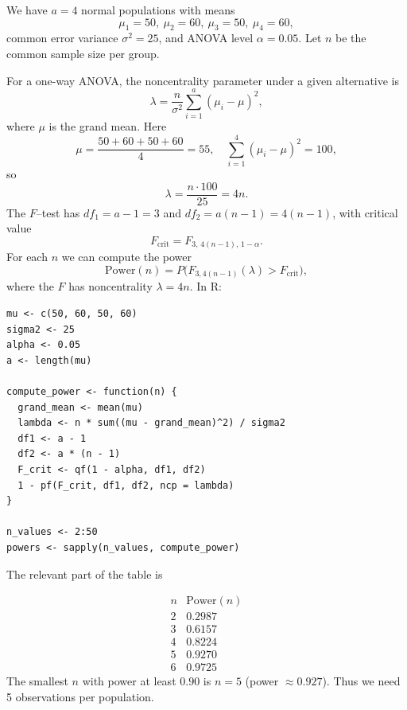 \documentclass[answers,12pt,addpoints]{exam}
\begin{document}
\begin{questions}
\begin{solution}
We have $a=4$ normal populations with means
\[
\mu_1=50,\ \mu_2=60,\ \mu_3=50,\ \mu_4=60,
\]
common error variance $\sigma^2=25$, and ANOVA level $\alpha=0.05$. Let $n$ be the common sample size per group.

For a one-way ANOVA, the noncentrality parameter under a given alternative is
\[
\lambda = \frac{n}{\sigma^2}\sum_{i=1}^a(\mu_i-\mu)^2,
\]
where $\mu$ is the grand mean. Here
\[
\mu = \frac{50+60+50+60}{4}=55,\quad
\sum_{i=1}^4(\mu_i-\mu)^2 = 100,
\]
so
\[
\lambda = \frac{n\cdot 100}{25} = 4n.
\]
The $F$–test has $df_1 = a-1 = 3$ and $df_2 = a(n-1) = 4(n-1)$, with critical value
\[
F_{\text{crit}} = F_{3,\,4(n-1),\,1-\alpha}.
\]
For each $n$ we can compute the power
\[
\text{Power}(n) = P\bigl(F_{3,4(n-1)}(\lambda) > F_{\text{crit}}\bigr),
\]
where the $F$ has noncentrality $\lambda=4n$. In R:

\begin{verbatim}
mu <- c(50, 60, 50, 60)
sigma2 <- 25
alpha <- 0.05
a <- length(mu)

compute_power <- function(n) {
  grand_mean <- mean(mu)
  lambda <- n * sum((mu - grand_mean)^2) / sigma2
  df1 <- a - 1
  df2 <- a * (n - 1)
  F_crit <- qf(1 - alpha, df1, df2)
  1 - pf(F_crit, df1, df2, ncp = lambda)
}

n_values <- 2:50
powers <- sapply(n_values, compute_power)
\end{verbatim}

The relevant part of the table is

\[
\begin{array}{c|c}
n & \text{Power}(n)\\
\hline
2 & 0.2987\\
3 & 0.6157\\
4 & 0.8224\\
5 & 0.9270\\
6 & 0.9725
\end{array}
\]
The smallest $n$ with power at least $0.90$ is $n=5$ (power $\approx 0.927$). Thus we need 5 observations per population.
\end{solution}



\end{questions}
\end{document}
